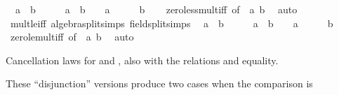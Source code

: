 \begin{isabellebody}
\ \ {\isachardoublequoteopen}a\ {\isacharasterisk}{\kern0pt}\ b\ {\isacharless}{\kern0pt}\ {}\ {\isasymlongleftrightarrow}\ {}\ {\isacharless}{\kern0pt}\ a\ {\isasymand}\ b\ {\isacharless}{\kern0pt}\ {}\ {\isasymor}\ a\ {\isacharless}{\kern0pt}\ {}\ {\isasymand}\ {}\ {\isacharless}{\kern0pt}\ b{\isachardoublequoteclose}\isanewline
%
\isadelimproof
\ \ %
\endisadelimproof
%
\isatagproof
{}\isamarkupfalse%
\ zero{\isacharunderscore}{\kern0pt}less{\isacharunderscore}{\kern0pt}mult{\isacharunderscore}{\kern0pt}iff\ {\isacharbrackleft}{\kern0pt}of\ {\isachardoublequoteopen}{\isacharminus}{\kern0pt}\ a{\isachardoublequoteclose}\ b{\isacharbrackright}{\kern0pt}\ \isamarkupfalse%
\ auto%
\endisatagproof
{\isafoldproof}%
%
\isadelimproof
\isanewline
%
\endisadelimproof
\isanewline
{}\isamarkupfalse%
\ mult{\isacharunderscore}{\kern0pt}le{\isacharunderscore}{\kern0pt}{}{\isacharunderscore}{\kern0pt}iff\ {\isacharbrackleft}{\kern0pt}algebra{\isacharunderscore}{\kern0pt}split{\isacharunderscore}{\kern0pt}simps{\isacharcomma}{\kern0pt}\ field{\isacharunderscore}{\kern0pt}split{\isacharunderscore}{\kern0pt}simps{\isacharbrackright}{\kern0pt}{\isacharcolon}{\kern0pt}\isanewline
\ \ {\isachardoublequoteopen}a\ {\isacharasterisk}{\kern0pt}\ b\ {\isasymle}\ {}\ {\isasymlongleftrightarrow}\ {}\ {\isasymle}\ a\ {\isasymand}\ b\ {\isasymle}\ {}\ {\isasymor}\ a\ {\isasymle}\ {}\ {\isasymand}\ {}\ {\isasymle}\ b{\isachardoublequoteclose}\isanewline
%
\isadelimproof
\ \ %
\endisadelimproof
%
\isatagproof
{}\isamarkupfalse%
\ zero{\isacharunderscore}{\kern0pt}le{\isacharunderscore}{\kern0pt}mult{\isacharunderscore}{\kern0pt}iff\ {\isacharbrackleft}{\kern0pt}of\ {\isachardoublequoteopen}{\isacharminus}{\kern0pt}\ a{\isachardoublequoteclose}\ b{\isacharbrackright}{\kern0pt}\ \isamarkupfalse%
\ auto%
\endisatagproof
{\isafoldproof}%
%
\isadelimproof
%
\endisadelimproof
%
\begin{isamarkuptext}%
Cancellation laws for  and ,
  also with the relations \isa{{\isasymle}} and equality.%
\end{isamarkuptext}\isamarkuptrue%
%
\begin{isamarkuptext}%
These ``disjunction'' versions produce two cases when the comparison is

\end{isamarkuptext}
\end{isabellebody}
